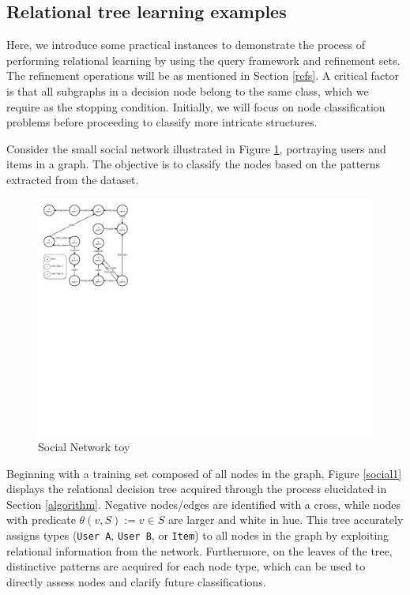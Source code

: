 \documentclass[mathematics,article,submit,pdftex,moreauthors]{Definitions/mdpi}
\begin{document}
\subsection{Relational tree learning examples}
\label{kd}

Here, we introduce some practical instances to demonstrate the process of performing relational learning by using the query framework and refinement sets. The refinement operations will be as mentioned in Section \ref{refs}. A critical factor is that all subgraphs in a decision node belong to the same class, which we require as the stopping condition. Initially, we will focus on node classification problems before proceeding to classify more intricate structures. 

Consider the small social network illustrated in Figure \ref{grafo1}, portraying users and items in a graph. The objective is to classify the nodes based on the patterns extracted from the dataset.

\begin{figure}[h!]
  \centering
  \includegraphics[scale=0.6]{png/FIG8.pdf}
  \caption{Social Network toy}
  \label{grafo1}
\end{figure}

Beginning with a training set composed of all nodes in the graph, Figure \ref{social1} displays the relational decision tree acquired through the process elucidated in Section \ref{algorithm}. Negative nodes/edges are identified with a cross, while nodes with predicate $\theta(v,S) := v \in S$ are larger and white in hue. This tree accurately assigns types (\texttt{User A}, \texttt{User B}, or \texttt{Item}) to all nodes in the graph by exploiting relational information from the network. Furthermore, on the leaves of the tree, distinctive patterns are acquired for each node type, which can be used to directly assess nodes and clarify future classifications. 
\end{document}
